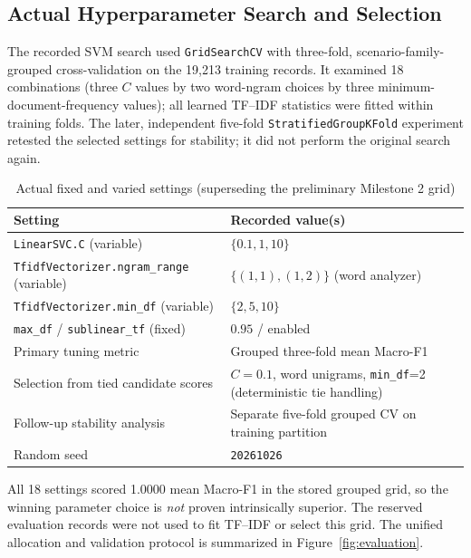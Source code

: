 \subsection{Actual Hyperparameter Search and Selection}
The recorded SVM search used \texttt{GridSearchCV} with three-fold, scenario-family-grouped cross-validation on the 19,213 training records. It examined 18 combinations (three $C$ values by two word-ngram choices by three minimum-document-frequency values); all learned TF--IDF statistics were fitted within training folds. The later, independent five-fold \texttt{StratifiedGroupKFold} experiment retested the selected settings for stability; it did not perform the original search again.
\begin{table}[H]\centering\caption{Actual fixed and varied settings (superseding the preliminary Milestone 2 grid)}\label{tab:m2grid}\small\begin{tabularx}{\textwidth}{p{}X}\toprule
Setting & Recorded value(s)\\\midrule
\texttt{LinearSVC.C} (variable) & $\{0.1,1,10\}$\\
\texttt{TfidfVectorizer.ngram\_range} (variable) & $\{(1,1),(1,2)\}$ (word analyzer)\\
\texttt{TfidfVectorizer.min\_df} (variable) & $\{2,5,10\}$\\
\texttt{max\_df} / \texttt{sublinear\_tf} (fixed) & $0.95$ / enabled\\
Primary tuning metric & Grouped three-fold mean Macro-F1\\
Selection from tied candidate scores & $C=0.1$, word unigrams, \texttt{min\_df}=2 (deterministic tie handling)\\
Follow-up stability analysis & Separate five-fold grouped CV on training partition\\
Random seed & \texttt{20261026}\\\bottomrule
\end{tabularx}\end{table}
All 18 settings scored 1.0000 mean Macro-F1 in the stored grouped grid, so the winning parameter choice is \emph{not} proven intrinsically superior. The reserved evaluation records were not used to fit TF--IDF or select this grid. The unified allocation and validation protocol is summarized in Figure~\ref{fig:evaluation}.

